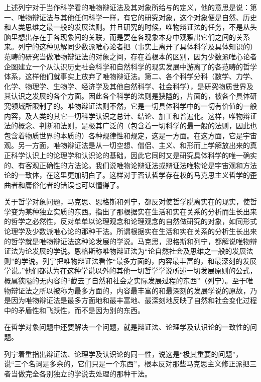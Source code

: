 上述列宁对于当作科学看的唯物辩证法及其对象所给与的定义，他的意思是说：第一、唯物辩证法与其他任何科学一样，有它的研究对象，这个对象便是自然、历史和人类思维之最一般的发展法则。并且研究的时候，唯物辩证法的任务，不是从头脑里想出存在于各现象间的关联，而是要在各现象本身中观察出它们之间的关系来。列宁的这种见解同少数派唯心论者把（事实上离开了具体科学及具体知识的）范畴的研究当做唯物辩证法的对象之间，存在着根本的区别，因为少数派唯心论者企图建立一个从认识历史社会科学和自然科学的现实发展中游离了的各范畴的哲学体系，这样他们就事实上放弃了唯物辩证法。第二、各个科学分科（数学、力学、化学、物理学、生物学、经济学及其他自然科学、社会科学），是研究物质世界及其认识之发展的各个方面。因此各个科学的法则是狭隘的，片面的，被各个具体研究领域所限制了的。唯物辩证法则不然，它是一切具体科学中的一切有价值的一般内容，及人类的其它一切科学认识之总计、结论、加工和普遍化。这样，唯物辩证法的概念、判断和法则，是极其广泛的（包含着一切科学的最一般的法则，因此也包含着物质世界的本质的）各种规律性和规定，这是一方面。在这方面，它是宇宙观。另一方面，唯物辩证法是从一切空想、僧侣、主义、和形而上学解放出来的真正科学认识上的论理学和认识论的基础，因此它同时又是研究具体科学的唯一确实的、有客观正确性的方法论。我们说唯物论辩证法或辩证法唯物论是宇宙观和方法论的一致体，在这里更加明白了。这样对于否认哲学存在权的马克思主义哲学的歪曲者和庸俗化者的错误也可以懂得了。

关于哲学对象问题，马克思、恩格斯和列宁，都反对使哲学脱离实在的现实，使哲学变为某种独立实质的东西。指出了那根据实在生活和实在关系的分析而生长出来的哲学之必然性，反对单单以论理观念和论理观念的自然做研究的对象，如同形式论理学及少数派唯心论的那种干法。所谓根据实在生活和实在关系的分析生长出来的哲学就是唯物辩证法这种论发展的学说。马克思，恩格斯和列宁，都解说唯物辩证法为论发展的学说。恩格斯称唯物辩证法为“论自然社会及思维之一般的发展法则”的学说。列宁把唯物辩证法看作“最多方面的，内容最丰富的，和最深刻的发展学说。”他们都认为在这种学说以外的其他一切哲学学说所述一切发展原则的公式，概属狭隘的无内容的“截去了自然和社会之实际发展过程的东西”（列宁）。至于唯物辩证法之所以被称为最多方面的，内容最丰富的和最深刻的发展学说的原故，乃是因为唯物辩证法是最多方面地和最丰富地、最深刻地反映了自然和社会变化过程中的矛盾性和飞跃性，而不是因为别的东西。

在哲学对象问题中还要解决一个问题，就是辩证法、论理学及认识论的一致性的问题。

列宁着重指出辩证法、论理学及认识论的同一性，说这是“极其重要的问题”，说“三个名词是多余的，它们只是一个东西”，根本反对那些马克思主义修正派把三者当做完全各别独立的学说去处理的那种干法。

